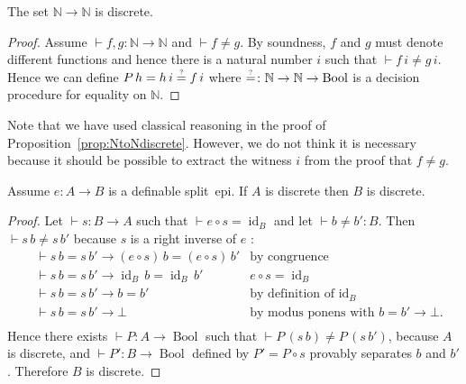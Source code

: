 \documentclass[envcountsame]{llncs}
\newcommand{\N}{\mathbb{N}}
\DeclareMathOperator{\Bool}{Bool}
\DeclareMathOperator{\id}{id}
\newcommand{\eqqm}{\overset{\text{\tiny ?}}{=}}
\begin{document}
\begin{proposition}\label{prop:NtoNdiscrete}
The set $\N\to\N$ is discrete.
\end{proposition}
\begin{proof}
Assume $\vdash f, g\colon \N \to \N$ and $\vdash f\neq g$. By soundness, $f$ and $g$ must denote different functions and hence there is a natural number $i$ such that $\vdash f\,i\neq g\,i$. Hence we can define $P\,h = {h\,i} \eqqm {f\,i}$ where ${\eqqm}\colon \N\to\N\to\Bool$ is a decision procedure for equality on $\N$.
\end{proof}

Note that we have used classical reasoning in the proof of Proposition~\ref{prop:NtoNdiscrete}. However, we do not think it is necessary because it should be possible to extract the witness $i$ from the proof that $f\neq g$.

\begin{proposition}\label{prop:splitepidiscrete}
Assume $ e\colon A\to B$ is a definable split~epi.  If $A$ is discrete then $B$ is discrete.
\end{proposition}
\begin{proof}
Let $\vdash s\colon B\to A$ such that $\vdash e \circ s=\id_B$ and let $\vdash b\neq b'\colon B$. Then $\vdash s\,b\neq s\,b'$ because  $s$ is a right inverse of $e$ :
\begin{align*}
&\vdash s\,b = s\,b'\to (e\circ s)\, b = (e\circ s)\,b'&\text{by congruence}  \\
&\vdash s\,b = s\,b'\to \id_B\, b = \id_B\,b'&e\circ s = \id_B  \\
&\vdash s\,b = s\,b'\to b = b'&\text{by definition of $\id_B$}\\
&\vdash s\,b = s\,b'\to \bot&\text{by modus ponens with $b=b'\to\bot.$}\\
\end{align*}Hence there exists $\vdash P\colon A\to\Bool$ such that $\vdash P\,(s\,b)\neq P\,(s\,b')$, because $A$ is discrete, and  $\vdash P'\colon B\to\Bool$ defined by $P' = P\circ s$ provably separates $b$ and $b'$.
Therefore $B$ is discrete.
\end{proof}
\end{document}

